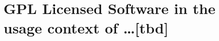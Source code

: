 %
%
%
%
%



\section{GPL Licensed Software in the usage context of \ldots [tbd]}
\label{OSUC-01-GPL} \label{OSUC-03-GPL} 
\label{OSUC-06-GPL} \label{OSUC-09-GPL}

\label{OSUC-02-GPL} \label{OSUC-04-GPL} \label{OSUC-05-GPL}
\label{OSUC-07-GPL} \label{OSUC-08-GPL} \label{OSUC-10-GPL}


%
